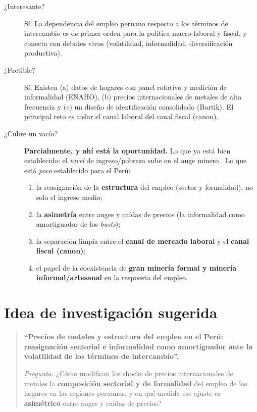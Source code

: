 \documentclass[11pt]{article}
\begin{document}
\begin{description}
  \item[¿Interesante?] Sí. La dependencia del empleo peruano respecto a los términos de
  intercambio es de primer orden para la política macro-laboral y fiscal, y conecta con
  debates vivos (volatilidad, informalidad, diversificación productiva).
  \item[¿Factible?] Sí. Existen (a) datos de hogares con panel rotativo y medición de
  informalidad (ENAHO), (b) precios internacionales de metales de alta frecuencia y (c) un
  diseño de identificación consolidado (Bartik). El principal reto es aislar el canal laboral
  del canal fiscal (canon).
  \item[¿Cubre un vacío?] \textbf{Parcialmente, y ahí está la oportunidad.} Lo que ya está
  bien establecido: el \emph{nivel} de ingreso/pobreza sube en el auge minero
  \citep{aragon2013,loayza2016}. Lo que está \emph{poco} establecido para el Perú:
  \begin{enumerate}[label=(\roman*)]
    \item la reasignación de la \textbf{estructura} del empleo (sector y formalidad), no solo
      el ingreso medio;
    \item la \textbf{asimetría} entre auges y caídas de precios (la informalidad como
      amortiguador de los \emph{busts});
    \item la separación limpia entre el \textbf{canal de mercado laboral} y el
      \textbf{canal fiscal (canon)};
    \item el papel de la coexistencia de \textbf{gran minería formal y minería
      informal/artesanal} en la respuesta del empleo.
  \end{enumerate}
\end{description}

\section{Idea de investigación sugerida}

\begin{quote}
\textbf{``Precios de metales y estructura del empleo en el Perú: reasignación sectorial e
informalidad como amortiguador ante la volatilidad de los términos de intercambio''.}

\medskip
\noindent\emph{Pregunta.} ¿Cómo modifican los shocks de precios internacionales de metales la
\textbf{composición sectorial y de formalidad} del empleo de los hogares en las regiones
peruanas, y en qué medida ese ajuste es \textbf{asimétrico} entre auges y caídas de precios?
\end{quote}
\end{document}
